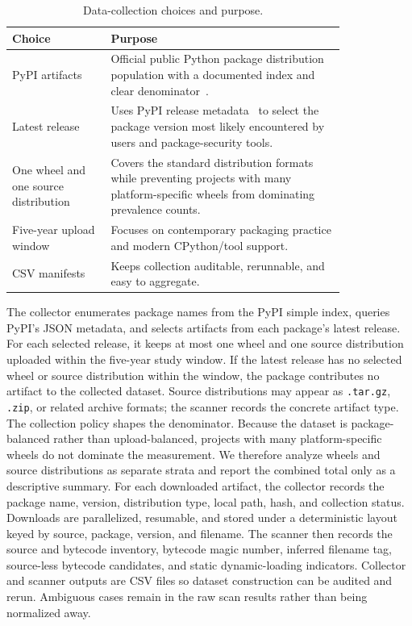 \begin{table}[htp]
  \centering
  \caption{Data-collection choices and purpose.}
  \label{tab:data-collection-design}
  \begin{tabular}{p{0.24\linewidth}p{0.58\linewidth}}
    \toprule
    Choice & Purpose \\
    \midrule
    PyPI artifacts & Official public Python package distribution population with a documented index and clear denominator~\cite{pypi-docs,pypi-index-api}. \\
    Latest release & Uses PyPI release metadata~\cite{pypi-json-api} to select the package version most likely encountered by users and package-security tools. \\
    One wheel and one source distribution & Covers the standard distribution formats~\cite{python-package-formats} while preventing projects with many platform-specific wheels from dominating prevalence counts. \\
    Five-year upload window & Focuses on contemporary packaging practice and modern CPython/tool support. \\
    CSV manifests & Keeps collection auditable, rerunnable, and easy to aggregate. \\
    \bottomrule
  \end{tabular}
\end{table}

The collector enumerates package names from the PyPI simple index, queries PyPI's JSON metadata, and selects artifacts from each package's latest release.  For each selected release, it keeps at most one wheel and one source distribution uploaded within the five-year study window.  If the latest release has no selected wheel or source distribution within the window, the package contributes no artifact to the collected dataset.  Source distributions may appear as \texttt{.tar.gz}, \texttt{.zip}, or related archive formats; the scanner records the concrete artifact type.
%
The collection policy shapes the denominator.  Because the dataset is package-balanced rather than upload-balanced, projects with many platform-specific wheels do not dominate the measurement.  We therefore analyze wheels and source distributions as separate strata and report the combined total only as a descriptive summary.
%
For each downloaded artifact, the collector records the package name, version, distribution type, local path, hash, and collection status.  Downloads are parallelized, resumable, and stored under a deterministic layout keyed by source, package, version, and filename.  The scanner then records the source and bytecode inventory, bytecode magic number, inferred filename tag, source-less bytecode candidates, and static dynamic-loading indicators.  Collector and scanner outputs are CSV files so dataset construction can be audited and rerun.  Ambiguous cases remain in the raw scan results rather than being normalized away.





